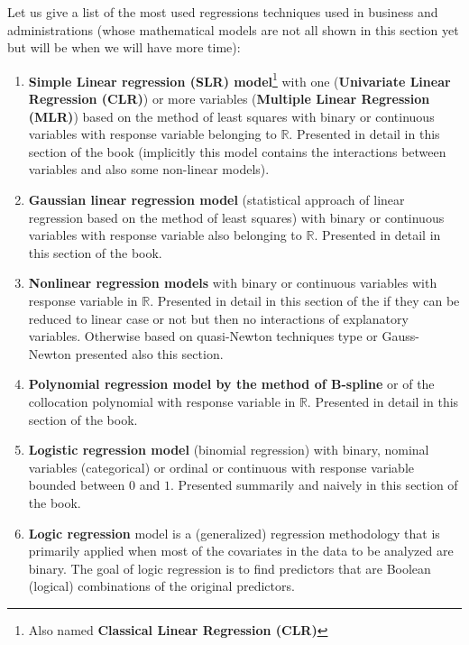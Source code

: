 	Let us give a list of the most used regressions techniques used in business and administrations (whose mathematical models are not all shown in this section yet but will be when we will have more time):
	\begin{enumerate}
		\item \textbf{Simple Linear regression (SLR) model}\footnote{Also named \textbf{Classical Linear Regression (CLR)}} with one (\textbf{Univariate Linear Regression (CLR)}) or more variables (\textbf{Multiple Linear Regression (MLR)}) based on the method of least squares with binary or continuous variables with response variable belonging to $\mathbb{R}$. Presented in detail in this section of the book (implicitly this model contains the interactions between variables and also some non-linear models).
		
		\item \textbf{Gaussian linear regression model} (statistical approach of linear regression based on the method of least squares) with binary or  continuous variables with response variable also belonging to $\mathbb{R}$. Presented in detail in this section of the book.
		
		\item \textbf{Nonlinear regression models} with binary or continuous variables with response variable in $\mathbb{R}$. Presented in detail in this section of the if they can be reduced to linear case or not but then no interactions of explanatory variables. Otherwise based on quasi-Newton techniques type or Gauss-Newton presented also this section.
		
		\item \textbf{Polynomial regression model by the method of B-spline} or of the collocation polynomial with response variable in $\mathbb{R}$. Presented in detail in this section of the book.
		
		\item \textbf{Logistic regression model} (binomial regression) with binary, nominal variables (categorical) or ordinal or continuous with response variable bounded between $0$ and $1$. Presented summarily and naively in this section of the book.
		
		\item \textbf{Logic regression} model is a (generalized) regression methodology that is primarily applied when most of the covariates in the data to be analyzed are binary. The goal of logic regression is to find predictors that are Boolean (logical) combinations of the original predictors. 
		

\end{enumerate}
